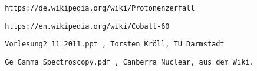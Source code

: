 \documentclass[]{article}
\begin{document}
	\newpage
	\begin{thebibliography}{}
		
		 \begin{verbatim}
		https://de.wikipedia.org/wiki/Protonenzerfall
		\end{verbatim}
		
		 \begin{verbatim}
		https://en.wikipedia.org/wiki/Cobalt-60
		\end{verbatim}
		
		\begin{verbatim}
		Vorlesung2_11_2011.ppt , Torsten Kröll, TU Darmstadt
		\end{verbatim}  
		
		\begin{verbatim}
		Ge_Gamma_Spectroscopy.pdf , Canberra Nuclear, aus dem Wiki.
		\end{verbatim}  
		
	\end{thebibliography}
\end{document}
